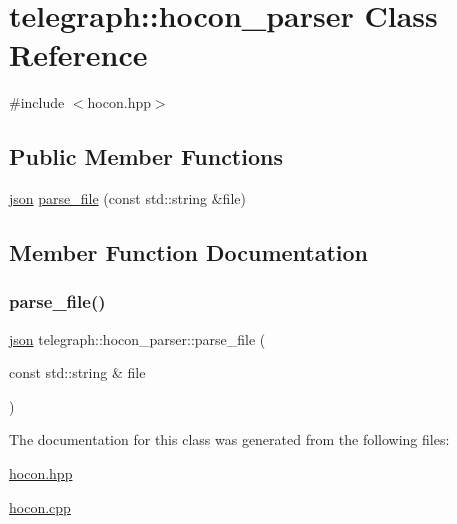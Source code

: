 \hypertarget{classtelegraph_1_1hocon__parser}{}\section{telegraph\+:\+:hocon\+\_\+parser Class Reference}
\label{classtelegraph_1_1hocon__parser}


{\ttfamily \#include $<$hocon.\+hpp$>$}

\subsection*{Public Member Functions}
\begin{DoxyCompactItemize}
\item 
\hyperlink{namespacetelegraph_ab87b47a6b955c365ddd74c343ecc16f4}{json} \hyperlink{classtelegraph_1_1hocon__parser_aca7015dbc13a62d958ff28588416c461}{parse\+\_\+file} (const std\+::string \&file)
\end{DoxyCompactItemize}


\subsection{Member Function Documentation}
\mbox{\label{classtelegraph_1_1hocon__parser_aca7015dbc13a62d958ff28588416c461}} 
\subsubsection{\texorpdfstring{parse\+\_\+file()}{parse\_file()}}
{\footnotesize\ttfamily \hyperlink{namespacetelegraph_ab87b47a6b955c365ddd74c343ecc16f4}{json} telegraph\+::hocon\+\_\+parser\+::parse\+\_\+file (\begin{DoxyParamCaption}\item[{const std\+::string \&}]{file }\end{DoxyParamCaption})}



The documentation for this class was generated from the following files\+:\begin{DoxyCompactItemize}
\item 
\hyperlink{hocon_8hpp}{hocon.\+hpp}\item 
\hyperlink{hocon_8cpp}{hocon.\+cpp}\end{DoxyCompactItemize}
